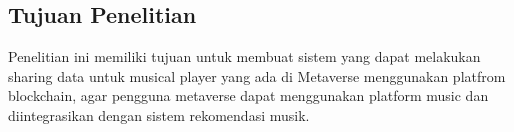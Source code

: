 \subsection{Tujuan Penelitian}

Penelitian ini memiliki tujuan untuk membuat sistem yang
dapat melakukan sharing data untuk musical player yang ada di Metaverse menggunakan platfrom blockchain, agar pengguna metaverse dapat menggunakan platform music dan diintegrasikan dengan sistem rekomendasi musik.